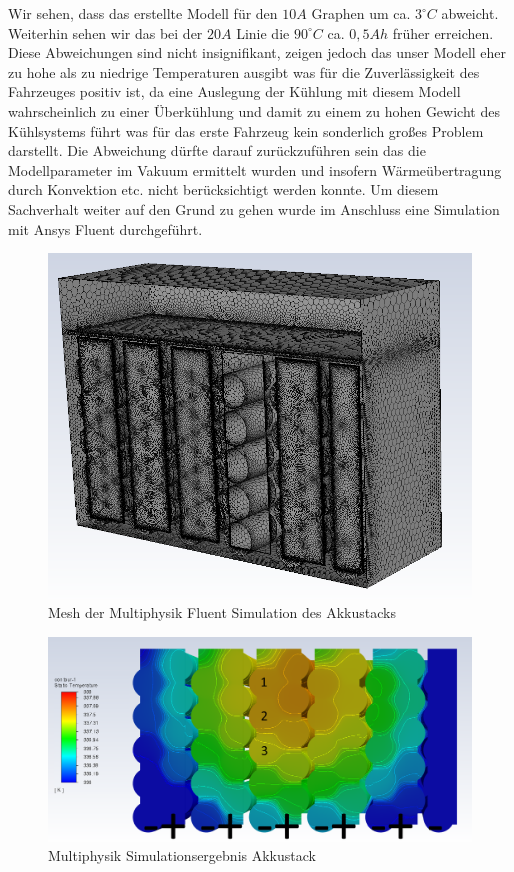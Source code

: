Wir sehen, dass das erstellte Modell für den \ensuremath{10 A} Graphen um ca. \ensuremath{3^\circ C} abweicht. Weiterhin sehen wir das bei der \ensuremath{20 A} Linie die \ensuremath{90^\circ C} ca. \ensuremath{0,5 Ah} früher erreichen. Diese Abweichungen sind nicht insignifikant, zeigen jedoch das unser Modell eher zu hohe als zu niedrige Temperaturen ausgibt was für die Zuverlässigkeit des Fahrzeuges positiv ist, da eine Auslegung der Kühlung mit diesem Modell wahrscheinlich zu einer Überkühlung und damit zu einem zu hohen Gewicht des Kühlsystems führt was für das erste Fahrzeug kein sonderlich großes Problem darstellt. Die Abweichung dürfte darauf zurückzuführen sein das die Modellparameter im Vakuum ermittelt wurden und insofern Wärmeübertragung durch Konvektion etc. nicht berücksichtigt werden konnte. Um diesem Sachverhalt weiter auf den Grund zu gehen wurde im Anschluss eine Simulation mit Ansys Fluent durchgeführt.

\begin{figure}[h]
	\centering
	\includegraphics[width=0.7\linewidth]{bilder/Accu_Sim_therm_7_2A_45min_simple_mesh}
	\caption{Mesh der Multiphysik Fluent Simulation des Akkustacks}
	\label{fig:accusimtherm72a45minsimplemesh}
\end{figure}

\begin{figure}[h]
	\centering
	\includegraphics[width=0.7\linewidth]{bilder/Accu_Sim_therm_7_2A_45min_simple}
	\caption{Multiphysik Simulationsergebnis Akkustack}
	\label{fig:accusimtherm72a45minsimple}
\end{figure}

